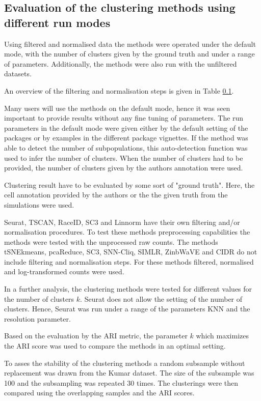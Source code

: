 \documentclass[11pt, a4paper]{article}\usepackage[]{graphicx}\usepackage[]{color}
\begin{document}
\subsection{Evaluation of the clustering methods using different run modes}
Using filtered and normalised data the methods were operated under the default mode, with the number of clusters given by the ground truth and under a range of parameters. Additionally, the methods were also run with the unfiltered datasets.
 
An overview of the filtering and normalisation steps is given in Table \ref{}.

Many users will use the methods on the default mode, hence it was seen important to provide results without any fine tuning of parameters.
The run parameters in the default mode were given either by the default setting of the packages or by examples in the different package vignettes. If the method was able to detect the number of subpopulations, this auto-detection function was used to infer the number of clusters. When the number of clusters had to be provided, the number of clusters given by the  authors annotation were used. 

Clustering result have to be evaluated by some sort of "ground truth". Here, the cell annotation provided by the authors or the the given truth from the simulations were used.

Seurat, TSCAN, RaceID, SC3 and Linnorm have their own filtering and/or normalisation procedures. To test these methods preprocessing capabilities the methods were tested with the unprocessed raw counts.
The methods tSNEkmeans, pcaReduce, SC3, SNN-Cliq, SIMLR, ZinbWaVE and CIDR do not include filtering and normalisation steps. For these methods filtered, normalised and log-transformed counts were used.

In a further analysis, the clustering methods were tested for different values for the number of clusters $k$. Seurat does not allow the setting of the number of clusters. Hence, Seurat was run under a range of the parameters  KNN and the resolution parameter.

Based on the evaluation by the ARI metric, the parameter $k$ which maximizes the ARI score was used to compare the methods in an optimal setting.

To asses the stability of the clustering methods a random subsample without replacement was drawn from the Kumar dataset. The size of the subsample was 100 and the subsampling was repeated 30 times. The clusterings were then compared using the overlapping samples and the ARI scores.  
\end{document}
